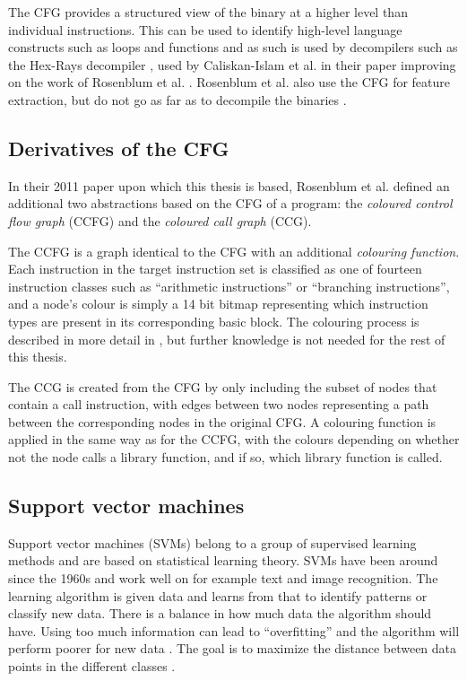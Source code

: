 \documentclass[a4paper,11pt]{kth-mag}
\begin{document}
The CFG provides a structured view of the binary at a higher level than
individual instructions. This can be used to identify high-level language
constructs such as loops and functions \parencite{cifuentes1993methodology} and
as such is used by decompilers such as the Hex-Rays decompiler \parencite{hex2013hex},
used by Caliskan-Islam et al. in their paper improving on the work of
Rosenblum et al. \parencite{caliskan2015coding}. Rosenblum et al. also use the
CFG for feature extraction, but do not go as far as to decompile the binaries
\parencite{rosenblum2011wrote}.

\subsection{Derivatives of the CFG}
\label{sec:cfg-derivatives}
In their 2011 paper upon which this thesis is based, Rosenblum et al. defined
an additional two abstractions based on the CFG of a program: the
\emph{coloured control flow graph} (CCFG) and the \emph{coloured call graph}
(CCG).

The CCFG is a graph identical to the CFG with an additional \emph{colouring
function}. Each instruction in the target instruction set is classified as one
of fourteen instruction classes such as ``arithmetic instructions'' or
``branching instructions'', and a node's colour is simply a 14 bit bitmap
representing which instruction types are present in its corresponding basic
block. The colouring process is described in more detail in
\parencite{rosenblum2011recovering}, but further knowledge is not needed for
the rest of this thesis.

The CCG is created from the CFG by only including the subset of nodes that contain
a call instruction, with edges between two nodes representing a path between
the corresponding nodes in the original CFG. A colouring function is applied in
the same way as for the CCFG, with the colours depending on whether not the
node calls a library function, and if so, which library function is called.

\subsection{Support vector machines}
\label{sec:svms}
Support vector machines (SVMs) belong to a group of supervised learning methods
and are based on statistical learning theory. SVMs have been around since the
1960s and work well on for example text and image recognition. The learning
algorithm is given data and learns from that to identify patterns or classify
new data. There is a balance in how much data the algorithm should have. Using
too much information can lead to ``overfitting'' and the algorithm will perform
poorer for new data \parencite{cristianini2000introduction}. The goal is to
maximize the distance between data points in the different classes
 \parencite{awad2004effective}. 
\end{document}
